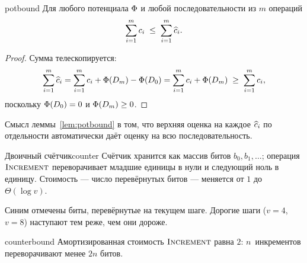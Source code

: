 \documentclass[../main.tex]{subfiles}
\begin{document}
\begin{Lemma}{}{potbound}
  Для любого потенциала $\Phi$ и любой последовательности из $m$ операций
  \[
    \sum_{i=1}^{m} c_i \;\le\; \sum_{i=1}^{m} \widehat{c}_i .
  \]
\end{Lemma}

\begin{proof}
  Сумма телескопируется:
  \[
    \sum_{i=1}^{m}\widehat{c}_i
      = \sum_{i=1}^{m} c_i + \Phi(D_m) - \Phi(D_0)
      = \sum_{i=1}^{m} c_i + \Phi(D_m) \;\ge\; \sum_{i=1}^{m} c_i,
  \]
  поскольку $\Phi(D_0) = 0$ и $\Phi(D_m) \ge 0$.
\end{proof}

Смысл леммы~\ref{lem:potbound} в том, что верхняя оценка на каждое $\widehat{c}_i$ по
отдельности автоматически даёт оценку на всю последовательность.

\begin{Example}{Двоичный счётчик}{counter}
  Счётчик хранится как массив битов $b_0, b_1, \dots$; операция
  $\textsc{Increment}$ переворачивает младшие единицы в нули и следующий ноль
  в единицу. Стоимость --- число перевёрнутых битов --- меняется от $1$ до
  $\Theta(\log v)$.

  \vspace{4pt}
  \centering
  \vspace{2pt}

  \raggedright\footnotesize\color{inkSoft}
  Синим отмечены биты, перевёрнутые на текущем шаге. Дорогие шаги
  ($v = 4$, $v = 8$) наступают тем реже, чем они дороже.
\end{Example}

\begin{Statement}{}{counterbound}
  Амортизированная стоимость $\textsc{Increment}$ равна $2$: $n$~инкрементов
  переворачивают менее $2n$ битов.
\end{Statement}
\end{document}
